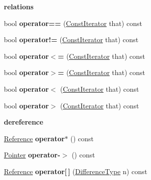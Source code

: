 \begin{Indent}\textbf{ relations}\par
\begin{DoxyCompactItemize}
\item 
\mbox{\label{a02004_a19a0ae160e627e733e192ad018686e7e}} 
bool {\bfseries operator==} (\hyperlink{a02004_ae5be27a73dce0be58ee2776db896d591}{Const\+Iterator} that) const
\item 
\mbox{\label{a02004_a2b2ccd1220d5bc92eef2fbc8824c9ecf}} 
bool {\bfseries operator!=} (\hyperlink{a02004_ae5be27a73dce0be58ee2776db896d591}{Const\+Iterator} that) const
\item 
\mbox{\label{a02004_a65c30731f77ed249c53c5cf55c9859e2}} 
bool {\bfseries operator$<$=} (\hyperlink{a02004_ae5be27a73dce0be58ee2776db896d591}{Const\+Iterator} that) const
\item 
\mbox{\label{a02004_a7d189ea30820684eec8efa847ed7a295}} 
bool {\bfseries operator$>$=} (\hyperlink{a02004_ae5be27a73dce0be58ee2776db896d591}{Const\+Iterator} that) const
\item 
\mbox{\label{a02004_acacffbbad7fca1ca5da64d3041dd2778}} 
bool {\bfseries operator$<$} (\hyperlink{a02004_ae5be27a73dce0be58ee2776db896d591}{Const\+Iterator} that) const
\item 
\mbox{\label{a02004_ae5dd7328fc780a57dd069d2183c9a26d}} 
bool {\bfseries operator$>$} (\hyperlink{a02004_ae5be27a73dce0be58ee2776db896d591}{Const\+Iterator} that) const
\end{DoxyCompactItemize}
\end{Indent}
\begin{Indent}\textbf{ dereference}\par
\begin{DoxyCompactItemize}
\item 
\mbox{\label{a02004_a56ad403f7e7a35d6060931685d6cbbe8}} 
\hyperlink{a02004_ae80f6b601eb9e24f73aa75fb32b35c65}{Reference} {\bfseries operator$\ast$} () const
\item 
\mbox{\label{a02004_abc95a8e52653a8baa2927b03239f4be9}} 
\hyperlink{a02004_ac69f141f1fde31c1f550f524a69c5de9}{Pointer} {\bfseries operator-\/$>$} () const
\item 
\mbox{\label{a02004_a41b59f1bd367a98ee5d1138cc81e98a7}} 
\hyperlink{a02004_ae80f6b601eb9e24f73aa75fb32b35c65}{Reference} {\bfseries operator\mbox{[}$\,$\mbox{]}} (\hyperlink{a02004_a902b99c8ae351cd7626514dc5f30740a}{Difference\+Type} n) const
\end{DoxyCompactItemize}
\end{Indent}
